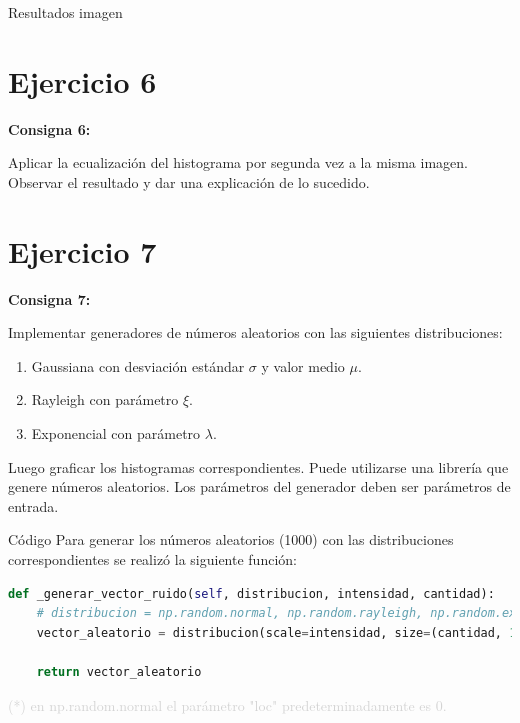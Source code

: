 \documentclass{beamer}
\begin{document}
\begin{frame}[fragile]{Resultados imagen}
\begin{minipage}{0.45\linewidth}
		\label{fig:lenaej5}
	\end{minipage}
\end{frame}

\section{Ejercicio 6}

\begin{frame}
	\begin{center}
		\textcolor{unahurverde}{\textbf{Consigna 6:}}
	\end{center}
	\justifying
	
	Aplicar la ecualización del histograma por segunda vez a la misma imagen.  
	Observar el resultado y dar una explicación de lo sucedido.
\end{frame}

\section{Ejercicio 7}

\begin{frame}
	\begin{center}
		\textcolor{unahurverde}{\textbf{Consigna 7:}}
	\end{center}
	\justifying
	
	Implementar generadores de números aleatorios con las siguientes distribuciones:
	
	\begin{enumerate}[label=\alph*)]
		\item Gaussiana con desviación estándar $\sigma$ y valor medio $\mu$.
		\item Rayleigh con parámetro $\xi$.
		\item Exponencial con parámetro $\lambda$.
	\end{enumerate}
	
	\vspace{0.3cm}
	
	Luego graficar los histogramas correspondientes.  
	Puede utilizarse una librería que genere números aleatorios.  
	Los parámetros del generador deben ser parámetros de entrada.
\end{frame}

\begin{frame}[fragile]{Código}
	\justifying
	Para generar los números aleatorios (1000) con las distribuciones correspondientes se realizó la siguiente función:
	
	\begin{lstlisting}[language=Python]
def _generar_vector_ruido(self, distribucion, intensidad, cantidad):
	# distribucion = np.random.normal, np.random.rayleigh, np.random.exponential
	vector_aleatorio = distribucion(scale=intensidad, size=(cantidad, 1))
	
	return vector_aleatorio
	\end{lstlisting}
	
	\vfill
	\footnotesize \textcolor{lightgray}{(*) en np.random.normal el parámetro "loc" predeterminadamente es 0.}
\end{frame}
\end{document}
